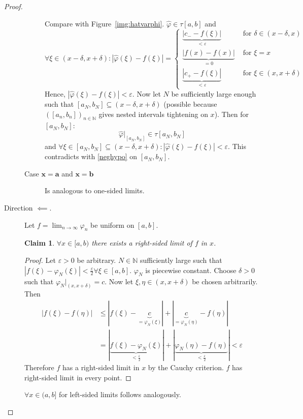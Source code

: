 \documentclass{article}
\newtheorem*{claim}{Claim}%
\newcommand{\card}[1]{\left|#1\right|}
\begin{document}
\begin{proof}
\begin{description}
\begin{description}
          Compare with Figure~\ref{img:hatvarphi}.
          $\hat{\varphi} \in \tau[a,b]$ and
          \[
            \forall \xi \in (x - \delta, x + \delta):
            \card{\hat\varphi(\xi) - f(\xi)} = \begin{cases}
              \underbrace{\card{c_- - f(\xi)}}_{< \varepsilon} & \text{ for } \delta \in (x - \delta, x) \\
              \underbrace{\card{f(x) - f(x)}}_{= 0} & \text{ for } \xi = x \\
              \underbrace{\card{c_+ - f(\xi)}}_{< \varepsilon} & \text{ for } \xi \in (x, x + \delta)
            \end{cases}
          \]
          Hence, $\card{\hat\varphi(\xi) - f(\xi)} < \varepsilon$.
          Now let $N$ be sufficiently large enough such that $[a_N, b_N] \subseteq (x - \delta, x + \delta)$
          (possible because $([a_n, b_n])_{n \in \mathbb N}$ gives nested intervals tightening on $x$).
          Then for $[a_N, b_N]$:
          \[ \hat\varphi|_{[a_N, b_N]} \in \tau[a_N, b_N] \]
          and $\forall \xi \in [a_N, b_N] \subseteq (x - \delta, x + \delta): \card{\hat{\varphi}(\xi) - f(\xi)} < \varepsilon$.
          This contradicts with \eqref{neghypo} on $[a_N, b_N]$.
        \item[Case $\mathbf{x = a}$ and $\mathbf{x = b}$]
          Is analogous to one-sided limits.
      \end{description}
    \item[Direction $\impliedby$.]
      Let $f = \lim_{n\to\infty} \varphi_n$ be uniform on $[a,b]$.

      \begin{claim}
        $\forall x \in [a,b)$ there exists a right-sided limit of $f$ in $x$.
      \end{claim}

      \begin{proof}
        Let $\varepsilon > 0$ be arbitrary. $N \in \mathbb N$ sufficiently large such that
        $\card{f(\xi) - \varphi_N(\xi)} < \frac\varepsilon2 \forall \xi \in [a,b]$.
        $\varphi_N$ is piecewise constant. Choose $\delta > 0$ such that
        $\varphi_N|_{(x, x+\delta)} = c$.
        Now let $\xi, \eta \in (x, x+\delta)$ be chosen arbitrarily.
        Then
        \begin{align*}
          \card{f(\xi) - f(\eta)} &\leq |{f(\xi) - \underbrace{c}_{= \varphi_N(\xi)}}| + |{\underbrace{c}_{= \varphi_N(\eta)} - f(\eta)}| \\
            &= |{\underbrace{f(\xi) - \varphi_N(\xi)}_{< \frac\varepsilon2}}| + |{\underbrace{\varphi_N(\eta) - f(\eta)}_{< \frac\varepsilon2}}|
            < \varepsilon
        \end{align*}
        Therefore $f$ has a right-sided limit in $x$ by the Cauchy criterion.
        $f$ has right-sided limit in every point.
      \end{proof}
      $\forall x \in (a, b]$ for left-sided limits follows analogously.
  \end{description}
\end{proof}
\end{document}
